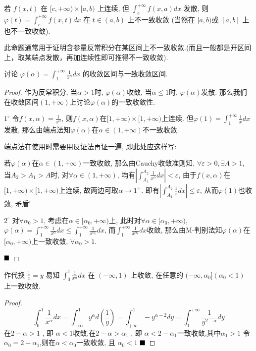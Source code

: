 \documentclass[lang=cn,newtx,10pt,scheme=chinese]{elegantbook}
\begin{document}
\begin{corollary}
    若 $f(x, t)$ 在 $[c, +\infty) \times [a, b)$ 上连续, 但 $\int_{c}^{+\infty} f(x, a) dx$ 发散, 则 $\varphi(t) = \int_{c}^{+\infty} f(x, t) dx$ 在 $t \in (a, b)$ 上不一致收敛 (当然在 $[a,b)$或 $[a, b]$ 上也不一致收敛). 
\end{corollary}
\begin{remark}
    此命题通常用于证明含参量反常积分在某区间上不一致收敛.(而且一般都是开区间上，取某端点发散，再加连续性即可推得不一致收敛).
\end{remark}

\begin{example}
讨论 $\varphi(\alpha) = \int_{1}^{+\infty} \frac{1}{x^\alpha} dx$ 的收敛区间与一致收敛区间.
\end{example}

\begin{proof}
作为反常积分, 当$\alpha > 1$时, $\varphi(\alpha)$收敛, 当$\alpha \le 1$时, $\varphi(\alpha)$发散.
那么我们在收敛区间$(1, +\infty)$上讨论$\varphi(\alpha)$的一致收敛性.

$1^{\circ}$ 令$f(x,\alpha) = \frac{1}{x^\alpha}$, 则$f(x,\alpha)$在$[1, +\infty) \times [1, +\infty)$上连续.
    但$\varphi(1) = \int_{1}^{+\infty} \frac{1}{x} dx$发散, 那么由端点法知$\varphi(\alpha)$在$\alpha \in (1, +\infty)$不一致收敛.
    
    端点法在使用时需要用反证法再证一遍, 即此处应这样写:

    若$\varphi(\alpha)$在$\alpha \in (1, +\infty)$一致收敛, 那么由Cauchy收敛准则知, $\forall \varepsilon > 0, \exists A > 1$, 当$A_2 > A_1 > A$时, 对$\forall \alpha \in (1, +\infty)$, 均有$|\int_{A_1}^{A_2} \frac{1}{x^\alpha} dx| < \varepsilon$, 由于$f(x,\alpha)$在$[1, +\infty) \times [1, +\infty)$上连续, 故两边可取$\alpha \to 1^+$.
    即有$|\int_{A_1}^{A_2} \frac{1}{x} dx| \le \varepsilon$, 从而$\varphi(1)$也收敛, 矛盾!

$2^{\circ}$ 对$\forall \alpha_0 > 1$, 考虑在$\alpha \in [\alpha_0, +\infty)$上, 此时对$\forall \alpha \in [\alpha_0, +\infty)$,
    $\varphi(\alpha) = \int_{1}^{+\infty} \frac{1}{x^\alpha} dx \le \int_{1}^{+\infty} \frac{1}{x^{\alpha_0}} dx$, 而$\int_{1}^{+\infty} \frac{1}{x^{\alpha_0}} dx$收敛,
    那么由M-判别法知$\varphi(\alpha)$在$[\alpha_0, +\infty)$上一致收敛, $\forall \alpha_0 > 1$.

$\hfill \blacksquare$
\end{proof}

\begin{corollary}
作代换 $\frac{1}{x}=y$ 易知 $\int_{0}^{1} \frac{1}{x^{\alpha}} dx$ 在 $(-\infty, 1)$ 上收敛, 在任意的 $(-\infty, \alpha_0] (\alpha_0 < 1)$ 上一致收敛.
\end{corollary}
\begin{proof}
$$ \int_{0}^{1} \frac{1}{x^{\alpha}} dx = \int_{+\infty}^{1} y^{\alpha} d\left(\frac{1}{y}\right) = \int_{+\infty}^{1} -y^{\alpha-2} dy = \int_{1}^{+\infty} \frac{1}{y^{2-\alpha}} dy $$
在$2-\alpha > 1$ , 即 $\alpha < 1$收敛,在$2-\alpha > \alpha_1$ , 即 $\alpha < 2-\alpha_1$一致收敛,其中$\alpha_1 > 1$
令 $\alpha_0 = 2-\alpha_1$,则在$\alpha < \alpha_0$一致收敛, 且 $\alpha_0 < 1$
$\hfill \blacksquare$
\end{proof}
\end{document}
